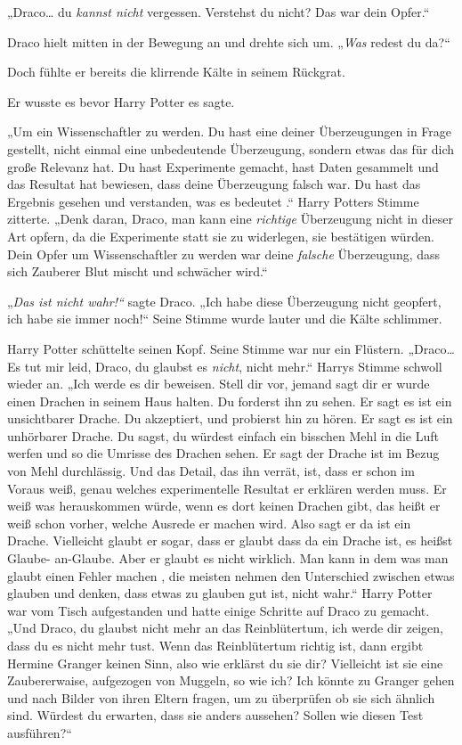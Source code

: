{„Draco… du \emph{kannst nicht} vergessen. Verstehst du nicht? Das war dein Opfer.“

Draco hielt mitten in der Bewegung an und drehte sich um. „\emph{Was} redest du da?“

Doch fühlte er bereits die klirrende Kälte in seinem Rückgrat.

Er wusste es bevor Harry Potter es sagte.

„Um ein Wissenschaftler zu werden. Du hast eine deiner Überzeugungen in Frage gestellt, nicht einmal eine unbedeutende Überzeugung, sondern etwas das für dich große Relevanz hat. Du hast Experimente gemacht, hast Daten gesammelt und das Resultat hat bewiesen, dass deine Überzeugung falsch war. Du hast das Ergebnis gesehen und verstanden, was es bedeutet .“ Harry Potters Stimme zitterte. „Denk daran, Draco, man kann eine \emph{richtige} Überzeugung nicht in dieser Art opfern, da die Experimente statt sie zu widerlegen, sie bestätigen würden. Dein Opfer um Wissenschaftler zu werden war deine \emph{falsche} Überzeugung, dass sich Zauberer Blut mischt und schwächer wird.“

„\emph{Das ist nicht wahr!“} sagte Draco. „Ich habe diese Überzeugung nicht geopfert, ich habe sie immer noch!“ Seine Stimme wurde lauter und die Kälte schlimmer.

Harry Potter schüttelte seinen Kopf. Seine Stimme war nur ein Flüstern. „Draco… Es tut mir leid, Draco, du glaubst es \emph{nicht}, nicht mehr.“ Harrys Stimme schwoll wieder an. „Ich werde es dir beweisen. Stell dir vor, jemand sagt dir er wurde einen Drachen in seinem Haus halten. Du forderst ihn zu sehen. Er sagt es ist ein unsichtbarer Drache. Du akzeptiert, und probierst hin zu hören. Er sagt es ist ein unhörbarer Drache. Du sagst, du würdest einfach ein bisschen Mehl in die Luft werfen und so die Umrisse des Drachen sehen. Er sagt der Drache ist im Bezug von Mehl durchlässig. Und das Detail, das ihn verrät, ist, dass er schon im Voraus weiß, genau welches experimentelle Resultat er erklären werden muss. Er weiß was herauskommen würde, wenn es dort keinen Drachen gibt, das heißt er weiß schon vorher, welche Ausrede er machen wird. Also sagt er da ist ein Drache. Vielleicht glaubt er sogar, dass er glaubt dass da ein Drache ist, es heißst Glaube- an-Glaube. Aber er glaubt es nicht wirklich. Man kann in dem was man glaubt einen Fehler machen , die meisten nehmen den Unterschied zwischen etwas glauben und denken, dass etwas zu glauben gut ist, nicht wahr.“ Harry Potter war vom Tisch aufgestanden und hatte einige Schritte auf Draco zu gemacht. „Und Draco, du glaubst nicht mehr an das Reinblütertum, ich werde dir zeigen, dass du es nicht mehr tust. Wenn das Reinblütertum richtig ist, dann ergibt Hermine Granger keinen Sinn, also wie erklärst du sie dir? Vielleicht ist sie eine Zaubererwaise, aufgezogen von Muggeln, so wie ich? Ich könnte zu Granger gehen und nach Bilder von ihren Eltern fragen, um zu überprüfen ob sie sich ähnlich sind. Würdest du erwarten, dass sie anders aussehen? Sollen wie diesen Test ausführen?“

}
